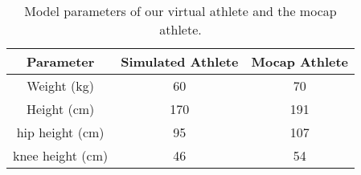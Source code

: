 \begin{table}[t]
\centering
\caption{Model parameters of our virtual athlete and the mocap athlete.}
\begin{tabular}{|c|c|c|} 
\hline
Parameter & Simulated Athlete & Mocap Athlete\\ 
\hline
Weight (kg) & 60  & 70     \\
\hline
Height (cm) & 170  & 191     \\
\hline
hip height (cm) & 95  & 107     \\
\hline
knee height (cm) & 46  & 54     \\
\hline
\end{tabular}
\label{tb:modelParams}
\end{table}
